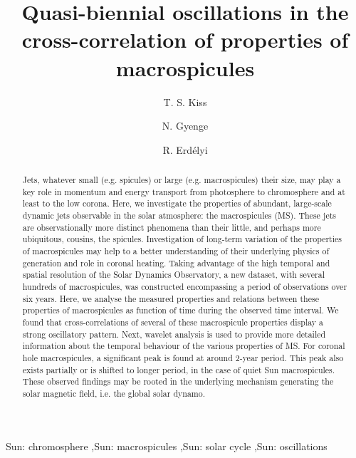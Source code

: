 \documentclass[final,authoryear,5p]{elsarticle}
\begin{document}
\begin{frontmatter}

\title{Quasi-biennial oscillations in the cross-correlation of properties of macrospicules}


\author[label1,label2]{T. S. Kiss}

\author[label1,label3]{N. Gyenge}
\author[label1]{R. Erd\'elyi}
\address[label1]{Solar Physics and Space Plasmas Research Centre (SP2RC), School of Mathematics and Statistics, University of Sheffield,\\ Hicks Building, Hounsfield Road, Sheffield, S3 7RH, United Kingdom}
\address[label2]{Department of Physics, University of Debrecen, Egyetem t\'er 1., Debrecen, H-4032, Hungary}
\address[label3]{Debrecen Heliophysical Observatory (DHO), Konkoly Astronomical Institute, Research Centre for Astronomy and Earth Sciences\\Hungarian Academy of Sciences, Debrecen, P.O.Box 30, H-4010, Hungary}

\begin{abstract}

Jets, whatever small (e.g. spicules) or large (e.g. macrospicules) their size, may play a key role in momentum and energy transport from photosphere to chromosphere and at least to the low corona. Here, we investigate the properties of abundant, large-scale dynamic jets observable in the solar atmosphere: the macrospicules (MS). These jets are observationally more distinct phenomena than their little, and perhaps more ubiquitous, cousins, the spicules. Investigation of long-term variation of the properties of macrospicules may help to a better understanding of their underlying physics of generation and role in coronal heating. Taking advantage of the high temporal and spatial resolution of the Solar Dynamics Observatory, a new dataset, with several hundreds of macrospicules, was constructed encompassing a period of observations over six years. Here, we analyse the measured properties and relations between these properties of macrospicules as function of time during the observed time interval. We found that cross-correlations of several of these macrospicule properties display a strong oscillatory pattern. Next, wavelet analysis is used to provide more detailed information about the temporal behaviour of the various properties of MS. For coronal hole macrospicules, a significant peak is found at around 2-year period. This peak also exists partially or is shifted to longer period, in the case of quiet Sun macrospicules. These observed findings may be rooted in the underlying mechanism generating the solar magnetic field, i.e. the global solar dynamo.

\end{abstract}

\begin{keyword}
Sun: chromosphere \sep Sun: macrospicules \sep Sun: solar cycle \sep Sun: oscillations  
\end{keyword}

\end{frontmatter}
\end{document}
